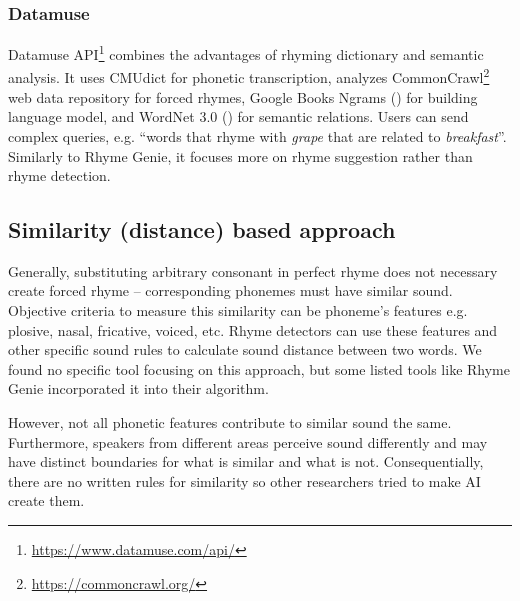 \subsubsection*{Datamuse}
Datamuse API\footnote{\url{https://www.datamuse.com/api/}} combines the advantages of  rhyming dictionary and semantic analysis. It uses CMUdict for phonetic transcription, analyzes CommonCrawl\footnote{\url{https://commoncrawl.org/}} web data repository for forced rhymes, Google Books Ngrams (\cite{weiss2015google}) for building language model, and WordNet 3.0 (\cite{pearson2005encyclopedia}) for semantic relations. Users can send complex queries, e.g. ``words that rhyme with \textit{grape} that are related to \textit{breakfast}''. Similarly to Rhyme Genie, it focuses more on rhyme suggestion rather than rhyme detection.


\subsection{Similarity (distance) based approach}
Generally, substituting arbitrary consonant in perfect rhyme does not necessary create forced rhyme -- corresponding phonemes must have similar sound. Objective criteria to measure this similarity can be phoneme's features e.g. plosive, nasal, fricative, voiced, etc. Rhyme detectors can use these features and other specific sound rules to calculate sound distance between two words. We found no specific tool focusing on this approach, but some listed tools like Rhyme Genie incorporated it into their algorithm. 

However, not all phonetic features contribute to similar sound the same. Furthermore, speakers from different areas perceive sound differently and may have distinct boundaries for what is similar and what is not. Consequentially, there are no written rules for similarity so other researchers tried to make AI create them.

